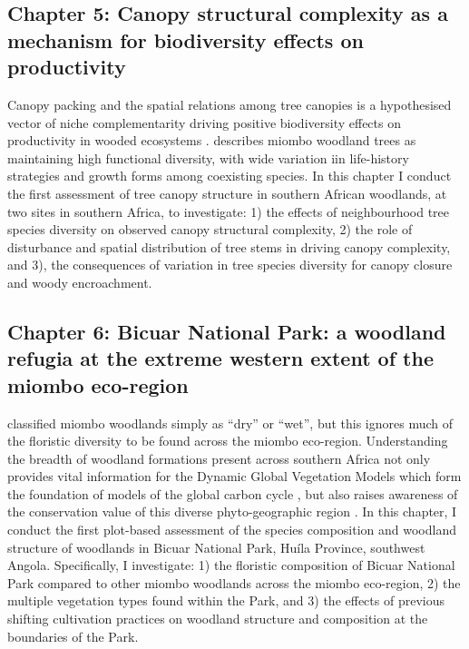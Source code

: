 \begin{refsection}
\subsection{Chapter 5: Canopy structural complexity as a mechanism for biodiversity effects on productivity}
\label{intro:ssec:chp5}

Canopy packing and the spatial relations among tree canopies is a hypothesised vector of niche complementarity driving positive biodiversity effects on productivity in wooded ecosystems \citep{Jucker2015, Oehri2020}. \citet{Frost1996} describes miombo woodland trees as maintaining high functional diversity, with wide variation iin life-history strategies and growth forms among coexisting species. In this chapter I conduct the first assessment of tree canopy structure in southern African woodlands, at two sites in southern Africa, to investigate: 1) the effects of neighbourhood tree species diversity on observed canopy structural complexity, 2) the role of disturbance and spatial distribution of tree stems in driving canopy complexity, and 3), the consequences of variation in tree species diversity for canopy closure and woody encroachment.

\subsection{Chapter 6: Bicuar National Park: a woodland refugia at the extreme western extent of the miombo eco-region}
\label{intro:ssec:chp6}

\citet{White1983} classified miombo woodlands simply as ``dry'' or ``wet'', but this ignores much of the floristic diversity to be found across the miombo eco-region. Understanding the breadth of woodland formations present across southern Africa not only provides vital information for the Dynamic Global Vegetation Models which form the foundation of models of the global carbon cycle \citep{Conradi2020}, but also raises awareness of the conservation value of this diverse phyto-geographic region \citep{Jew2016}. In this chapter, I conduct the first plot-based assessment of the species composition and woodland structure of woodlands in Bicuar National Park, Hu\'{i}la Province, southwest Angola. Specifically, I investigate: 1) the floristic composition of Bicuar National Park compared to other miombo woodlands across the miombo eco-region, 2) the multiple vegetation types found within the Park, and 3) the effects of previous shifting cultivation practices on woodland structure and composition at the boundaries of the Park.


\end{refsection}
